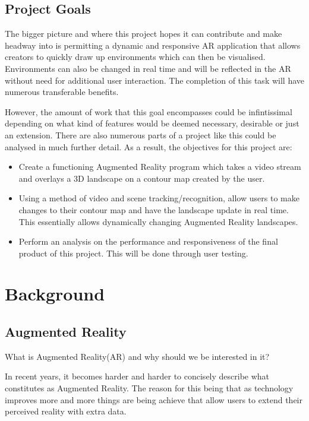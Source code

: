 \documentclass[11pt]{article}
\begin{document}
\subsection{Project Goals}
The bigger picture and where this project hopes it can contribute and make 
headway into is permitting a dynamic and responsive AR application that allows
creators to quickly draw up environments which can then be visualised. 
Environments can also be changed in real time and will be reflected in the AR
without need for additional user interaction. The completion of this
task will have numerous transferable benefits.

However, the amount of work that this goal encompasses could be infintissimal
depending on what kind of features would be deemed necessary, desirable or just an
extension. There are also numerous parts of a project like this could be 
analysed in much further detail. As a result, the objectives for this project
are:

\begin{itemize}
	\item Create a functioning Augmented Reality program which takes a
		  video stream and overlays a 3D landscape on a contour map created by
		  the user.
	\item Using a method of video and scene tracking/recognition, allow users
		  to make changes to their contour map and have the landscape update 
		  in real time. This essentially allows dynamically changing 
		  Augmented Reality landscapes.
	\item Perform an analysis on the performance and responsiveness 
		  of the final product of this project. This will be done
		  through user testing.
\end{itemize}

\newpage
\section{Background}

\subsection{Augmented Reality}
\begin{center}
What is Augmented Reality(AR) and why should we be interested in it? \\
\end{center}
In recent years, it becomes harder and harder to concisely describe what
constitutes as Augmented Reality. The reason for this being that as technology
improves more and more things are being achieve that allow users to extend
their perceived reality with extra data.\\ 
\end{document}
